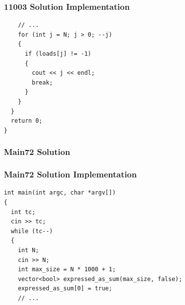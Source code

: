 \documentclass{beamer}
\newcommand{\spoj}[1]{Sphere Online Judge (http://www.spoj.com)
  problem: \textcolor{blue}{#1}.}
\newcommand{\codeforces}[1]{CodeForces (http://www.codeforces.com)
  problem: \textcolor{blue}{#1}.}
\newcommand{\codejam}[1]{Google Code Jam (https://code.google.com/codejam)
  problem: \textcolor{blue}{#1}.}
\newcommand{\hint}[1]{
\begin{bclogo}[arrondi=0.1, logo=\bclampe]{Hint}
#1
\end{bclogo}
}
\newcounter{exo}
\newcommand{\exo}{
  \addtocounter{exo}{1}
  Exercice \arabic{exo}
}
\begin{document}
\begin{frame}[containsverbatim]
\frametitle{11003 Solution Implementation}
\scriptsize

\begin{lstlisting}
    // ...
    for (int j = N; j > 0; --j)
    {
      if (loads[j] != -1)
      {
        cout << j << endl;
        break;
      }
    }
  }
  return 0;
}
\end{lstlisting}

\end{frame}

\fi

\ifanswers


\begin{frame}%
\frametitle{Main72 Solution}

\end{frame}

\begin{frame}[containsverbatim]
\frametitle{Main72 Solution Implementation}
\scriptsize

\begin{lstlisting}
int main(int argc, char *argv[])
{
  int tc;
  cin >> tc;
  while (tc--)
  {
    int N;
    cin >> N;
    int max_size = N * 1000 + 1;
    vector<bool> expressed_as_sum(max_size, false);
    expressed_as_sum[0] = true;
    // ...
\end{lstlisting}

\end{frame}
\end{document}

